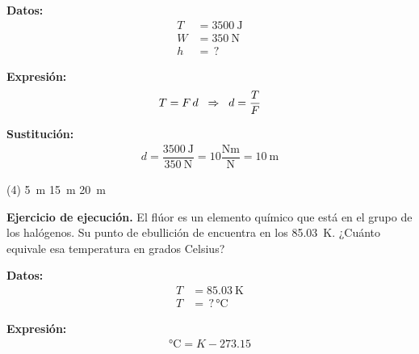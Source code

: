 \documentclass[12pt, letter]{exam}
\begin{document}
\begin{questions}
    \vspace*{0.3cm}
    \begin{minipage}[t]{0.4\linewidth}
    \textbf{Datos:}
    \begin{align*}
    T &= \SI{3500}{\joule} \\
    W &= \SI{350}{\newton} \\
    h &= \, ?
    \end{align*}
    \end{minipage}
    \hspace{1cm}
    \begin{minipage}[t]{0.4\linewidth}
    \textbf{Expresión:}
    \begin{align*}
    T = F \, d \hspace{0.2cm} \Rightarrow \hspace{0.2cm} d = \dfrac{T}{F}
    \end{align*}
    \end{minipage}

    \vspace*{0.3cm}
    \textbf{Sustitución:}
    \begin{align*}
        d = \dfrac{\SI{3500}{\joule}}{\SI{350}{\newton}} = \num{10} \dfrac{\unit{\newton\metre}}{\unit{\newton}} = \SI{10}{\meter}
    \end{align*}
    \begin{tasks}(4)
        \task \SI{5}{\meter}
        \task {}
        \task \SI{15}{\meter}
        \task \SI{20}{\meter}
    \end{tasks}
    \setcounter{question}{30} \question \textbf{Ejercicio de ejecución.} El flúor es un elemento químico que está en el grupo de los halógenos. Su punto de ebullición de encuentra en los \SI{85.03}{\kelvin}. ¿Cuánto equivale esa temperatura en grados Celsius?

    \vspace*{0.3cm}
    \begin{minipage}[t]{0.4\linewidth}
    \textbf{Datos:}
    \begin{align*}
    T &=  \SI{85.03}{\kelvin} \\
    T &= \, ? \, \unit{\degreeCelsius}
    \end{align*}
    \end{minipage}
    \hspace{1cm}
    \begin{minipage}[t]{0.4\linewidth}
    \textbf{Expresión:}
    \begin{align*}
    \unit{\degreeCelsius} = K - 273.15
    \end{align*}
    \end{minipage}


\end{questions}
\end{document}

